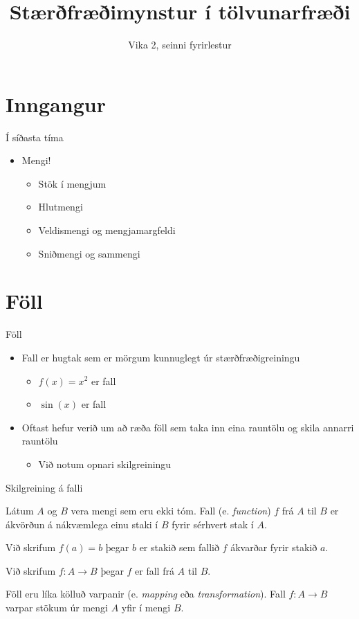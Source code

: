 \documentclass{beamer}
\title{Stærðfræðimynstur í tölvunarfræði}
\subtitle{Vika 2, seinni fyrirlestur}
\begin{document}
\begin{frame}
\titlepage
\end{frame}

\section{Inngangur}

\begin{frame}{Í síðasta tíma}
\begin{itemize}
 \item Mengi!
 \begin{itemize}
  \item Stök í mengjum
  \item Hlutmengi
  \item Veldismengi og mengjamargfeldi
  \item Sniðmengi og sammengi
 \end{itemize}
\end{itemize}
\end{frame}

\section{Föll}

\begin{frame}{Föll}
\begin{itemize}
 \item Fall er hugtak sem er mörgum kunnuglegt úr stærðfræðigreiningu
 \begin{itemize}
  \item $f(x) = x^2$ er fall
  \item $\sin(x)$ er fall
 \end{itemize}
 \item Oftast hefur verið um að ræða föll sem taka inn eina rauntölu og skila annarri rauntölu
 \begin{itemize}
  \item Við notum opnari skilgreiningu
 \end{itemize}
\end{itemize}
\end{frame}

\begin{frame}{Skilgreining á falli}
\begin{tcolorbox}[title=Fall]
Látum $A$ og $B$ vera mengi sem eru ekki tóm. Fall (e. \emph{function}) $f$ frá $A$ til $B$ er ákvörðun á nákvæmlega einu staki í $B$ fyrir sérhvert stak í $A$.

Við skrifum $f(a) = b$ þegar $b$ er stakið sem fallið $f$ ákvarðar fyrir stakið $a$.

Við skrifum $f: A \to B$ þegar $f$ er fall frá $A$ til $B$.
\end{tcolorbox}

Föll eru líka kölluð varpanir (e. \emph{mapping} eða \emph{transformation}). Fall $f: A \to B$ varpar stökum úr mengi $A$ yfir í mengi $B$.
\end{frame}
\end{document}
